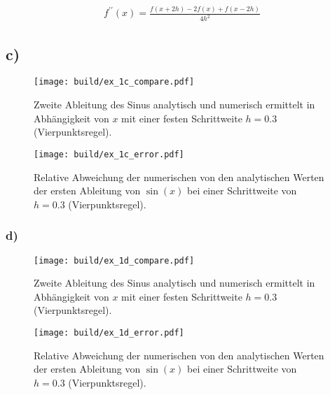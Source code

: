 \begin{align*}
    f^{\prime \prime} (x) = \frac{f(x+2h) - 2 f(x) + f(x-2h)}{4h^2}
\end{align*}
\FloatBarrier
\subsection*{c)}

\begin{figure}
    \centering
    \texttt{[image: build/ex\_1c\_compare.pdf]}
    \caption{Zweite Ableitung des Sinus analytisch und numerisch ermittelt in Abhängigkeit von 
    $x$ mit einer festen Schrittweite $h=0.3$ (Vierpunktsregel).}
    \label{fig:c_comp}
\end{figure}

\begin{figure}
    \centering
    \texttt{[image: build/ex\_1c\_error.pdf]}
    \caption{Relative Abweichung der numerischen von den analytischen Werten der ersten Ableitung von $\sin(x)$
    bei einer Schrittweite von $h=0.3$ (Vierpunktsregel).}
    \label{fig:rel_c}
\end{figure}
\FloatBarrier
\subsubsection*{d)}
\begin{figure}
    \centering
    \texttt{[image: build/ex\_1d\_compare.pdf]}
    \caption{Zweite Ableitung des Sinus analytisch und numerisch ermittelt in Abhängigkeit von 
    $x$ mit einer festen Schrittweite $h=0.3$ (Vierpunktsregel).}
    \label{fig:d_comp}
\end{figure}
\begin{figure}
    \centering
    \texttt{[image: build/ex\_1d\_error.pdf]}
    \caption{Relative Abweichung der numerischen von den analytischen Werten der ersten Ableitung von $\sin(x)$
    bei einer Schrittweite von $h=0.3$ (Vierpunktsregel).}
    \label{fig:rel_d}
\end{figure}